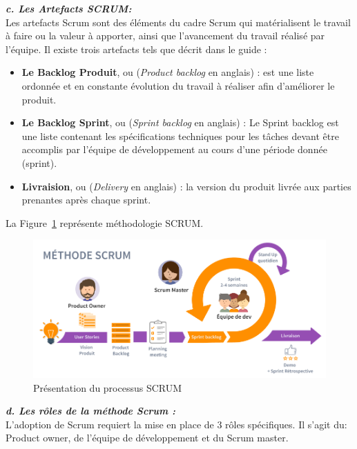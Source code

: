 \noindent
{\small\textbf{\textit{c. Les Artefacts SCRUM:}}}\mbox{} \\
Les artefacts Scrum sont des éléments du cadre Scrum qui matérialisent le travail à faire ou la valeur à apporter, ainsi que l'avancement du travail réalisé par l'équipe. Il existe trois artefacts tels que décrit dans le guide :

\begin{itemize}
  \item \small\textbf{Le Backlog Produit}, ou (\textit{Product backlog} en anglais) : est une liste ordonnée et en constante évolution du travail à réaliser afin d'améliorer le produit.
  
  \item \small\textbf{Le Backlog Sprint}, ou (\textit{Sprint backlog} en anglais) : Le Sprint backlog est une liste contenant les spécifications techniques pour les tâches devant être accomplis par l'équipe de développement au cours d'une période donnée (sprint).
  
  \item \small\textbf{Livraision}, ou (\textit{Delivery} en anglais) : la version du produit livrée aux parties prenantes après chaque sprint.
\end{itemize}

La Figure~\ref{fig:scrum} représente méthodologie SCRUM.

\begin{figure}[H]
\centering
\includegraphics[width=1\textwidth]{logos/scrum.png}
\caption{Présentation du processus SCRUM}
\label{fig:scrum}
\end{figure}

\newpage
\noindent
{\small\textbf{\textit{d. Les rôles de la méthode Scrum :}}}\mbox{} \\
L'adoption de Scrum requiert la mise en place de 3 rôles spécifiques. Il s'agit du: Product owner, de l'équipe de développement et du Scrum master.

